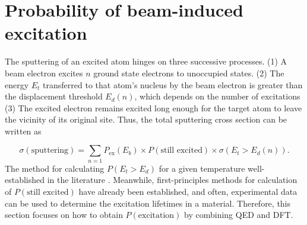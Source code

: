 \documentclass{article}
\begin{document}

\section{Probability of beam-induced excitation}
\label{sec:probability}
The sputtering of an excited atom hinges on three successive processes.
(1)
A beam electron excites $n$ ground state electrons to unoccupied states.
(2)
The energy $E_t$ transferred to that atom's nucleus by the beam electron is greater than the displacement threshold $E_d(n)$, which depends on the number of excitations
(3)
The excited electron remains excited long enough for the target atom to leave the vicinity of its original site.
Thus, the total sputtering cross section
can be written as

\begin{equation}
\label{eq:threeProbs}
    \sigma(\text{sputtering})
    =
    \sum_{n=1}
    P_\text{ex}(E_b)
    \times P(\text{still excited})
    \times \sigma\left(E_t > E_d(n)\right)
    .
\end{equation}
%
The method for calculating $P(E_t > E_d)$ for a given temperature well-established in the literature \cite{Meyer2012,Susi2016,Yoshimura2018}.  Meanwhile, first-principles methods for calculation of $P(\text{still excited})$ have already been established, and often, experimental data can be used to determine the excitation lifetimes in a material.  Therefore, this section focuses on how to obtain $P(\text{excitation})$ by combining QED and DFT.
\end{document}
